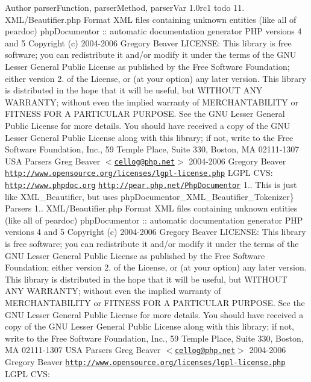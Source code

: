 \begin{DoxyAuthor}{\-Author}
parser\-Function, parser\-Method, parser\-Var  1.\-0rc1  todo 11.  \-X\-M\-L/\-Beautifier.\-php  \-Format \-X\-M\-L files containing unknown entities (like all of peardoc)  php\-Documentor \-:\-: automatic documentation generator  \-P\-H\-P versions 4 and 5  \-Copyright (c) 2004-\/2006 \-Gregory \-Beaver  \-L\-I\-C\-E\-N\-S\-E\-:  \-This library is free software; you can redistribute it and/or modify it under the terms of the \-G\-N\-U \-Lesser \-General \-Public \-License as published by the \-Free \-Software \-Foundation; either version 2. of the \-License, or (at your option) any later version.  \-This library is distributed in the hope that it will be useful, but \-W\-I\-T\-H\-O\-U\-T \-A\-N\-Y \-W\-A\-R\-R\-A\-N\-T\-Y; without even the implied warranty of \-M\-E\-R\-C\-H\-A\-N\-T\-A\-B\-I\-L\-I\-T\-Y or \-F\-I\-T\-N\-E\-S\-S \-F\-O\-R \-A \-P\-A\-R\-T\-I\-C\-U\-L\-A\-R \-P\-U\-R\-P\-O\-S\-E. \-See the \-G\-N\-U \-Lesser \-General \-Public \-License for more details.  \-You should have received a copy of the \-G\-N\-U \-Lesser \-General \-Public \-License along with this library; if not, write to the \-Free \-Software \-Foundation, \-Inc., 59 \-Temple \-Place, \-Suite 330, \-Boston, \-M\-A 02111-\/1307 \-U\-S\-A   \-Parsers  \-Greg \-Beaver $<$\href{mailto:cellog@php.net}{\tt cellog@php.\-net}$>$  2004-\/2006 \-Gregory \-Beaver  \href{http://www.opensource.org/licenses/lgpl-license.php}{\tt http\-://www.\-opensource.\-org/licenses/lgpl-\/license.\-php} \-L\-G\-P\-L  \-C\-V\-S\-:    \href{http://www.phpdoc.org}{\tt http\-://www.\-phpdoc.\-org}  \href{http://pear.php.net/PhpDocumentor}{\tt http\-://pear.\-php.\-net/\-Php\-Documentor}  1..  \-This is just like \-X\-M\-L\-\_\-\-Beautifier, but uses  php\-Documentor\-\_\-\-X\-M\-L\-\_\-\-Beautifier\-\_\-\-Tokenizer\}   \-Parsers  1..  \-X\-M\-L/\-Beautifier.\-php  \-Format \-X\-M\-L files containing unknown entities (like all of peardoc)  php\-Documentor \-:\-: automatic documentation generator  \-P\-H\-P versions 4 and 5  \-Copyright (c) 2004-\/2006 \-Gregory \-Beaver  \-L\-I\-C\-E\-N\-S\-E\-:  \-This library is free software; you can redistribute it and/or modify it under the terms of the \-G\-N\-U \-Lesser \-General \-Public \-License as published by the \-Free \-Software \-Foundation; either version 2. of the \-License, or (at your option) any later version.  \-This library is distributed in the hope that it will be useful, but \-W\-I\-T\-H\-O\-U\-T \-A\-N\-Y \-W\-A\-R\-R\-A\-N\-T\-Y; without even the implied warranty of \-M\-E\-R\-C\-H\-A\-N\-T\-A\-B\-I\-L\-I\-T\-Y or \-F\-I\-T\-N\-E\-S\-S \-F\-O\-R \-A \-P\-A\-R\-T\-I\-C\-U\-L\-A\-R \-P\-U\-R\-P\-O\-S\-E. \-See the \-G\-N\-U \-Lesser \-General \-Public \-License for more details.  \-You should have received a copy of the \-G\-N\-U \-Lesser \-General \-Public \-License along with this library; if not, write to the \-Free \-Software \-Foundation, \-Inc., 59 \-Temple \-Place, \-Suite 330, \-Boston, \-M\-A 02111-\/1307 \-U\-S\-A   \-Parsers  \-Greg \-Beaver $<$\href{mailto:cellog@php.net}{\tt cellog@php.\-net}$>$  2004-\/2006 \-Gregory \-Beaver  \href{http://www.opensource.org/licenses/lgpl-license.php}{\tt http\-://www.\-opensource.\-org/licenses/lgpl-\/license.\-php} \-L\-G\-P\-L  \-C\-V\-S\-:    
\end{DoxyAuthor}
